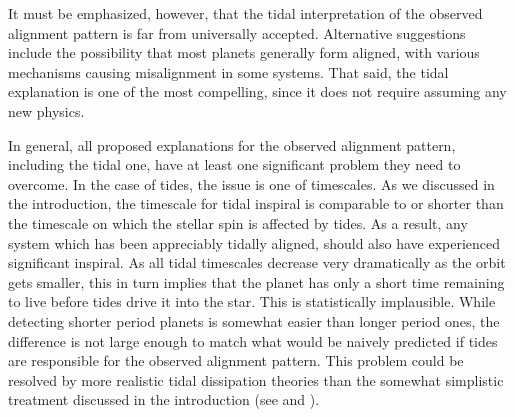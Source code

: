 It must be emphasized, however, that the tidal interpretation of the observed
alignment pattern is far from universally accepted.  Alternative suggestions
include the possibility that most planets generally form aligned, with various
mechanisms causing misalignment in some systems. That said, the tidal
explanation is one of the most compelling, since it does not require assuming
any new physics.

In general, all proposed explanations for the observed alignment pattern,
including the tidal one, have at least one significant problem they need to
overcome. In the case of tides, the issue is one of timescales. As we discussed
in the introduction, the timescale for tidal inspiral is comparable to or
shorter than the timescale on which the stellar spin is affected by tides. As a
result, any system which has been appreciably tidally aligned, should also have
experienced significant inspiral. As all tidal timescales decrease very
dramatically as the orbit gets smaller, this in turn implies that the planet has
only a short time remaining to live before tides drive it into the star. This is
statistically implausible. While detecting shorter period planets is somewhat
easier than longer period ones, the difference is not large enough to match what
would be naively predicted if tides are responsible for the observed alignment
pattern. This problem could be resolved by more realistic tidal dissipation
theories than the somewhat simplistic treatment discussed in the introduction
(see \citep{Lai_12} and \citep{Anderson_et_al_21}).
